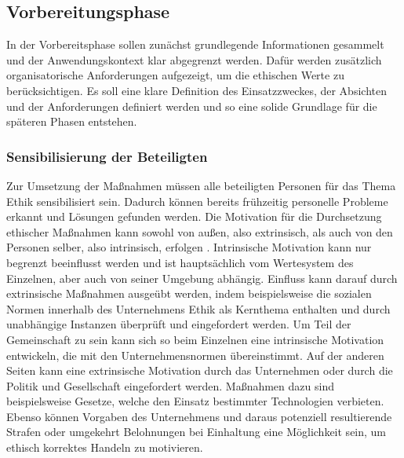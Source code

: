 \subsection{Vorbereitungsphase}\label{sub:vorbereitungsphase}
In der Vorbereitsphase sollen zunächst grundlegende Informationen gesammelt und der Anwendungskontext klar abgegrenzt werden.
Dafür werden zusätzlich organisatorische Anforderungen aufgezeigt, um die ethischen Werte zu berücksichtigen.
Es soll eine klare Definition des Einsatzzweckes, der Absichten und der Anforderungen definiert werden und so eine solide Grundlage für die späteren Phasen entstehen.

\subsubsection{Sensibilisierung der Beteiligten}
Zur Umsetzung der Maßnahmen müssen alle beteiligten Personen für das Thema Ethik sensibilisiert sein.
Dadurch können bereits frühzeitig personelle Probleme erkannt und Lösungen gefunden werden.
Die Motivation für die Durchsetzung ethischer Maßnahmen kann sowohl von außen, also extrinsisch, als auch von den Personen selber, also intrinsisch, erfolgen \cite{baum2017}.
Intrinsische Motivation kann nur begrenzt beeinflusst werden und ist hauptsächlich vom Wertesystem des Einzelnen, aber auch von seiner Umgebung abhängig.
Einfluss kann darauf durch extrinsische Maßnahmen ausgeübt werden, indem beispielsweise die sozialen Normen innerhalb des Unternehmens Ethik als Kernthema enthalten und durch unabhängige Instanzen überprüft und eingefordert werden.
Um Teil der Gemeinschaft zu sein kann sich so beim Einzelnen eine intrinsische Motivation entwickeln, die mit den Unternehmensnormen übereinstimmt.
Auf der anderen Seiten kann eine extrinsische Motivation durch das Unternehmen oder durch die Politik und Gesellschaft eingefordert werden.
Maßnahmen dazu sind beispielsweise Gesetze, welche den Einsatz bestimmter Technologien verbieten.
Ebenso können Vorgaben des Unternehmens und daraus potenziell resultierende Strafen oder umgekehrt Belohnungen bei Einhaltung eine Möglichkeit sein, um ethisch korrektes Handeln zu motivieren.
